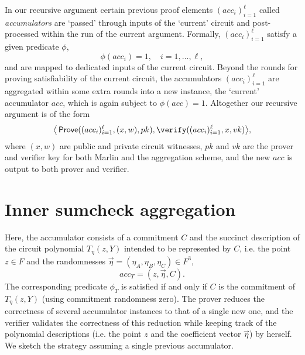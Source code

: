\documentclass[10pt,article,oneside]{memoir}
\theoremstyle{definition}
\theoremstyle{remark}
\DeclareMathOperator{\prove}{\mathsf{Prove}}
\begin{document}
In our recursive argument certain previous proof elements  $(acc_i)_{i=1}^\ell$ called \textit{accumulators} are `passed' through inputs of the `current' circuit and post-processed within the run of the current argument.
Formally, $(acc_i)_{i=1}^\ell$ satisfy a given predicate $\phi$, 
\[
\phi(acc_i)=1, \quad i=1,\ldots,\ell,
\]  
and are mapped to dedicated inputs of the current circuit.
Beyond the rounds for proving satisfiability of the current circuit, the accumulators $(acc_i)_{i=1}^\ell$ are aggregated within some extra rounds into a new instance, the `current' accumulator $acc$, which is again subject to $\phi(acc)=1$.
Altogether our recursive argument is of the form
\[
\big\langle \prove ((acc_i)_{i=1}^\ell, (x,w), pk), \verify((acc_i)_{i=1}^\ell,x,vk) \big\rangle,
\]
where $(x,w)$ are public and private circuit witnesses, $pk$ and $vk$ are  the prover and verifier key for both Marlin and the aggregation scheme, and the new $acc$ is output to both prover and verifier.  



\section{Inner sumcheck aggregation} 
\label{s:InnerSumcheckAggregation}

Here, the accumulator consists of a commitment $C$ and the succinct description of the circuit polynomial $T_\eta(z,Y)$ intended to be represented by $C$, i.e. the point $z\in F$ and the randomnesses $\vec\eta=(\eta_A,\eta_B,\eta_C)\in F^3$, 
\[
acc_{T} = (z, \vec\eta, C).
\]
The corresponding predicate $\phi_T$ is satisfied if and only if $C$ is the commitment of $T_\eta(z,Y)$ (using commitment randomness zero).
The prover reduces the correctness of several accumulator instances to that of a single new one, and the verifier validates the correctness of this reduction while keeping track of the polynomial descriptions (i.e. the point $z$ and the coefficient vector $\vec\eta$)  by herself.
We sketch the strategy assuming a single previous accumulator.
\end{document}
